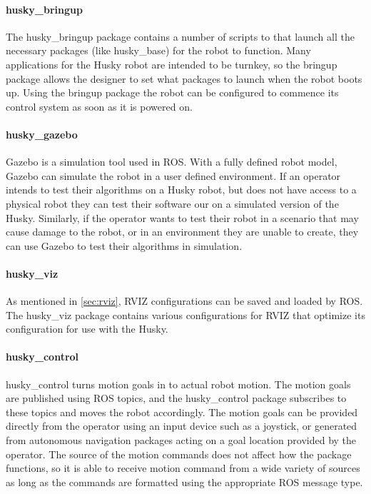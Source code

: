 \paragraph{husky\_bringup}

The husky\_bringup package contains a number of scripts to that launch all the necessary packages (like husky\_base) for the robot to function. Many applications for the Husky robot are intended to be turnkey, so the bringup package allows the designer to set what packages to launch when the robot boots up. Using the bringup package the robot can be configured to commence its control system as soon as it is powered on.\\

\paragraph{husky\_gazebo}

Gazebo is a simulation tool used in ROS. With a fully defined robot model, Gazebo can simulate the robot in a user defined environment. If an operator intends to test their algorithms on a Husky robot, but does not have access to a physical robot they can test their software our on a simulated version of the Husky. Similarly, if the operator wants to test their robot in a scenario that may cause damage to the robot, or in an environment they are unable to create, they can use Gazebo to test their algorithms in simulation.\\

\paragraph{husky\_viz}

As mentioned in \ref{sec:rviz}, RVIZ configurations can be saved and loaded by ROS. The husky\_viz package contains various configurations for RVIZ that optimize its configuration for use with the Husky.\\

\paragraph{husky\_control}

husky\_control turns motion goals in to actual robot motion. The motion goals are published using ROS topics, and the husky\_control package subscribes to these topics and moves the robot accordingly. The motion goals can be provided directly from the operator using an input device such as a joystick, or generated from autonomous navigation packages acting on a goal location provided by the operator. The source of the motion commands does not affect how the package functions, so it is able to receive motion command from a wide variety of sources as long as the commands are formatted using the appropriate ROS message type.\\ 

